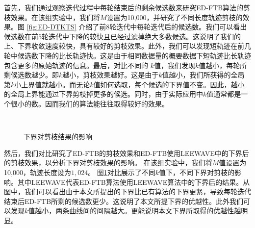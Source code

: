 首先，我们通过观察迭代过程中每轮结束后的剩余候选数来研究ED-FTB算法的剪枝效果。在该组实验中，我们将$M$设置为10,000，并研究了不同长度轨迹剪枝的效果。图 \ref{fig:ED-DTKTS} 介绍了前8轮迭代中每轮迭代后的候选数。我们可以看出候选数在前5轮迭代中下降的较快且已经过滤掉绝大多数候选。这说明了我们的上、下界收敛速度较快，具有较好的剪枝效果。此外，我们可以发现短轨迹在前几轮中候选数下降的比长轨迹快。这是由于相同数据量的概要数据下短轨迹比长轨迹包含更多的原始轨迹的信息。最后，对比不同的 $k$值，我们发现$k$值越小，每轮所剩候选数越少。即$k$越小，剪枝效果越好。这是由于$k$值越小，我们所获得的全局第$k$小上界值就越小。而无论$k$值如何选取，每个候选的下界值不变。因此，越小的全局上界能通过下界剪枝掉更多的候选。同时，由于实际应用中$k$值通常都是一个很小的数。因而我们的算法能往往取得较好的效果。
\begin{figure}[t]
		\centering
\\
	\caption{下界对剪枝结果的影响}
	\label{fig:PruningCmp}
\end{figure}

然后，我们对比研究了ED-FTB的剪枝效果和ED-FTB使用LEEWAVE中的下界后的剪枝效果，以分析下界对剪枝效果的影响。
在该组实验中，我们将$M$值设置为10,000，轨迹长度设为$1,024$。
图\ref{fig:PruningCmp}对比展示了不同$k$值下，不同下界对剪枝的影响。其中LEEWAVE代表ED-FTB算法使用LEEWAVE算法中的下界后的结果。从图中，我们可以看出由于本文所提出的下界比已有算法的下界更紧，导致每轮迭代结束后ED-FTB所剩的候选数更少。这说明了本文所提下界的优越性。此外我们可以发现$k$值越小，两条曲线间的间隔越大。更能说明本文下界所取得的优越性越明显。


